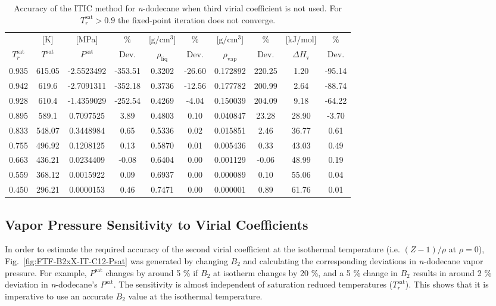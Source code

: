 \documentclass[%
 aip,
 jcp,
 sd,%
 amsmath,amssymb,
 reprint,%
]{revtex4-1}
\begin{document}
\begin{table}[]
\centering
\caption{Accuracy of the ITIC method for \textit{n}-dodecane when third virial coefficient is not used. For $T_r^{\mathrm{sat}}>0.9$ the fixed-point iteration does not converge.}
\label{tab:NIST-VAL-C12-FTF}
\begin{ruledtabular}
\begin{tabular}{cccccccccc}
 & {[}K{]} &	 {[}MPa{]} &	 \% 	& {[}$\mathrm{g/cm^3}${]} & \% & {[}$\mathrm{g/cm^3}${]} & \% 	& {[}kJ/mol{]} & \% \\
$T_r^{\mathrm{sat}}$ & $T^{\mathrm{sat}}$ & $P^{\mathrm{sat}}$ & Dev. & $\rho_{\mathrm{liq}}$ &	 Dev. & $\rho_{\mathrm{vap}}$ & Dev. & $\Delta H_{\mathrm{v}}$ & Dev. \\
\hline
0.935 & 615.05 & -2.5523492 & -353.51 & 0.3202 & -26.60 & 0.172892 & 220.25 & 1.20  & -95.14 \\
0.942 & 619.6  & -2.7091311 & -352.18 & 0.3736 & -12.56 & 0.177782 & 200.99 & 2.64  & -88.74 \\
0.928 & 610.4  & -1.4359029 & -252.54 & 0.4269 & -4.04  & 0.150039 & 204.09 & 9.18  & -64.22 \\
0.895 & 589.1  & 0.7097525  & 3.89    & 0.4803 & 0.10   & 0.040847 & 23.28  & 28.90 & -3.70  \\
0.833 & 548.07 & 0.3448984  & 0.65    & 0.5336 & 0.02   & 0.015851 & 2.46   & 36.77 & 0.61   \\
0.755 & 496.92 & 0.1208125  & 0.13    & 0.5870 & 0.01   & 0.005436 & 0.33   & 43.03 & 0.49   \\
0.663 & 436.21 & 0.0234409  & -0.08   & 0.6404 & 0.00   & 0.001129 & -0.06  & 48.99 & 0.19   \\
0.559 & 368.12 & 0.0015922  & 0.09    & 0.6937 & 0.00   & 0.000089 & 0.10   & 55.06 & 0.04   \\
0.450 & 296.21 & 0.0000153  & 0.46    & 0.7471 & 0.00   & 0.000001 & 0.89   & 61.76 & 0.01  \\
\end{tabular}
\end{ruledtabular}
\end{table}

\subsection{Vapor Pressure Sensitivity to Virial Coefficients} \label{sec:Bx-Sensitivity}
In order to estimate the required accuracy of the second virial coefficient at the isothermal temperature (i.e. $(Z-1)/\rho$ at $\rho=0$), Fig.~\ref{fig:FTF-B2xX-IT-C12-Psat} was generated by changing $B_2$ and calculating the corresponding deviations in \textit{n}-dodecane vapor pressure. For example, $P^{\mathrm{sat}}$ changes by around 5 \% if $B_2$ at isotherm changes by 20 \%, and a 5 \% change in $B_2$ results in around 2 \% deviation in \textit{n}-dodecane's $P^{\mathrm{sat}}$. The sensitivity is almost independent of saturation reduced temperatures ($T_r^{\mathrm{sat}}$). This shows that it is imperative to use an accurate $B_2$ value at the isothermal temperature.
\end{document}
